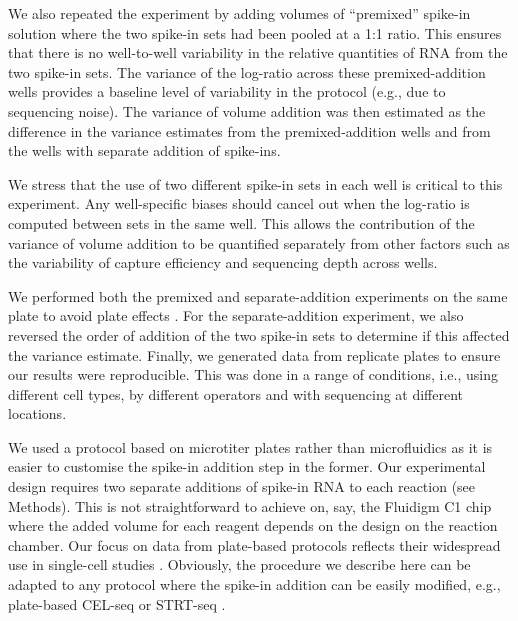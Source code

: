 \documentclass{article}
\begin{document}
We also repeated the experiment by adding volumes of ``premixed'' spike-in solution where the two spike-in sets had been pooled at a 1:1 ratio.
This ensures that there is no well-to-well variability in the relative quantities of RNA from the two spike-in sets.
The variance of the log-ratio across these premixed-addition wells provides a baseline level of variability in the protocol (e.g., due to sequencing noise).
The variance of volume addition was then estimated as the difference in the variance estimates from the premixed-addition wells and from the wells with separate addition of spike-ins.

We stress that the use of two different spike-in sets in each well is critical to this experiment.
Any well-specific biases should cancel out when the log-ratio is computed between sets in the same well.
This allows the contribution of the variance of volume addition to be quantified separately from other factors such as the variability of capture efficiency and sequencing depth across wells.

We performed both the premixed and separate-addition experiments on the same plate to avoid plate effects \autocite{hicks2015widespread,tung2016batch}.
For the separate-addition experiment, we also reversed the order of addition of the two spike-in sets to determine if this affected the variance estimate.
Finally, we generated data from replicate plates to ensure our results were reproducible.
This was done in a range of conditions, i.e., using different cell types, by different operators and with sequencing at different locations.

We used a protocol based on microtiter plates rather than microfluidics as it is easier to customise the spike-in addition step in the former.
Our experimental design requires two separate additions of spike-in RNA to each reaction (see Methods).
This is not straightforward to achieve on, say, the Fluidigm C1 chip where the added volume for each reagent depends on the design on the reaction chamber.
Our focus on data from plate-based protocols reflects their widespread use in single-cell studies \autocite{segerstople2016single,islam2011characterization,wilson2015combined,scialdone2016resolving}.
Obviously, the procedure we describe here can be adapted to any protocol where the spike-in addition can be easily modified, e.g., plate-based CEL-seq \autocite{hashimshony2016celseq2} or STRT-seq \autocite{islam2011characterization}.
\end{document}
